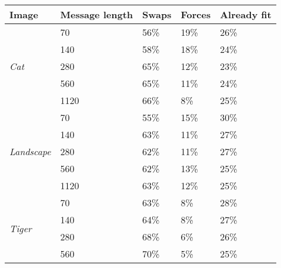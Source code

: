 \vspace{12pt}
\begin{table}[]
\centering
\begin{tabular}{@{}lllll@{}}
\textbf{Image}                      & \textbf{Message length} & \textbf{Swaps} & \textbf{Forces} & \textbf{Already fit} \\ \midrule
\multirow{5}{*}{\textit{Cat}}       & 70                      & 56\%           & 19\%            & 26\%                 \\
                                    & 140                     & 58\%           & 18\%            & 24\%                 \\
                                    & 280                     & 65\%           & 12\%            & 23\%                 \\
                                    & 560                     & 65\%           & 11\%            & 24\%                 \\
                                    & 1120                    & 66\%           & 8\%             & 25\%                 \\ \midrule
\multirow{5}{*}{\textit{Landscape}} & 70                      & 55\%           & 15\%            & 30\%                 \\
                                    & 140                     & 63\%           & 11\%            & 27\%                 \\
                                    & 280                     & 62\%           & 11\%            & 27\%                 \\
                                    & 560                     & 62\%           & 13\%            & 25\%                 \\
                                    & 1120                    & 63\%           & 12\%            & 25\%                 \\ \midrule
\multirow{5}{*}{\textit{Tiger}}     & 70                      & 63\%           & 8\%             & 28\%                 \\
                                    & 140                     & 64\%           & 8\%             & 27\%                 \\
                                    & 280                     & 68\%           & 6\%             & 26\%                 \\
                                    & 560                     & 70\%           & 5\%             & 25\%                 \\

\end{tabular}
\end{table}
